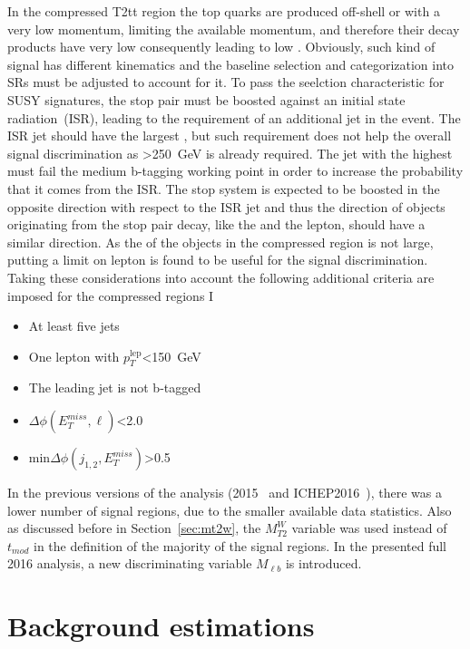 In the compressed T2tt region the top quarks are produced off-shell or with a very low momentum, limiting the available momentum,  and therefore their decay products have very low \pt consequently leading to  low \MET. Obviously, such kind of signal has different kinematics and the baseline selection and categorization into SRs must be adjusted to account for it. To pass the \MET seelction characteristic for SUSY signatures, the stop pair must be boosted against an initial state radiation~(ISR), leading to the requirement of  an additional jet in the event. The ISR jet should have the largest \pt, but such requirement does not help the overall signal discrimination as \MET>250~GeV is already required. The jet with the highest \pt must fail the medium b-tagging working point in order to increase the probability that it comes from the ISR. The stop system is expected to be boosted in the opposite direction with respect to the ISR jet and thus the direction of objects originating from the stop pair decay, like the \MET and the lepton, should have a similar direction. As the \pt of the objects in the compressed region is not large, putting a limit on lepton \pt is found to be useful for the signal discrimination. Taking these considerations into account the following additional criteria are imposed for the compressed regions I 

\begin{itemize}
\item At least five jets
\item One lepton with $p_{T}^{\mathrm{lep}}$<150~GeV
\item The leading jet is not b-tagged
\item $\Delta \phi(E_{T}^{miss}, \ell)$<2.0 
\item min$\Delta \phi (j_{1,2}, E_{T}^{miss})$>0.5
\end{itemize}

In the previous versions of the analysis (2015~\cite{Sirunyan:2016jpr} and ICHEP2016~\cite{CMS:2016vew}), there was a lower number of signal regions, due to the smaller available data statistics. Also as discussed before in Section~\ref{sec:mt2w}, the $M_{T2}^{W}$ variable was used instead of $t_{mod}$ in the definition of the majority of the signal regions. In the presented full 2016 analysis, a new discriminating variable $M_{\ell b}$ is introduced. %


\section{Background estimations~\label{sec:estimations}}

